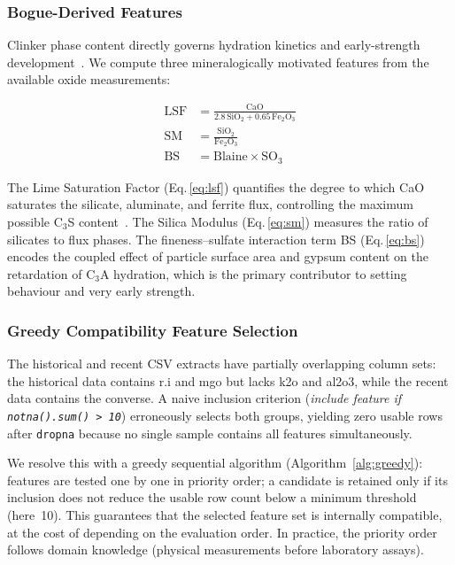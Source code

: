 \documentclass[preprint,12pt]{elsarticle}
\begin{document}
\subsubsection{Bogue-Derived Features}

Clinker phase content directly governs hydration kinetics and early-strength
development~\cite{bogue1929,taylor1997}.
We compute three mineralogically motivated features from the available oxide
measurements:

\begin{align}
  \text{LSF} &= \frac{\text{CaO}}{2.8\,\text{SiO}_2 + 0.65\,\text{Fe}_2\text{O}_3}
  \label{eq:lsf} \\[6pt]
  \text{SM}  &= \frac{\text{SiO}_2}{\text{Fe}_2\text{O}_3}
  \label{eq:sm}  \\[6pt]
  \text{BS}  &= \text{Blaine} \times \text{SO}_3
  \label{eq:bs}
\end{align}

The Lime Saturation Factor (Eq.\,\ref{eq:lsf}) quantifies the degree to which
CaO saturates the silicate, aluminate, and ferrite flux, controlling the maximum
possible C$_3$S content~\cite{taylor1997}.
The Silica Modulus (Eq.\,\ref{eq:sm}) measures the ratio of silicates to flux
phases.
The fineness--sulfate interaction term BS (Eq.\,\ref{eq:bs}) encodes the
coupled effect of particle surface area and gypsum content on the retardation
of C$_3$A hydration, which is the primary contributor to setting behaviour and
very early strength.

\subsubsection{Greedy Compatibility Feature Selection}
\label{sec:greedy}

The historical and recent CSV extracts have partially overlapping column sets:
the historical data contains r.i and mgo but lacks k2o and al2o3, while the
recent data contains the converse.
A naive inclusion criterion (\emph{include feature if \texttt{notna().sum() > 10}})
erroneously selects both groups, yielding zero usable rows after
\texttt{dropna} because no single sample contains all features simultaneously.

We resolve this with a greedy sequential algorithm (Algorithm~\ref{alg:greedy}):
features are tested one by one in priority order; a candidate is retained only
if its inclusion does not reduce the usable row count below a minimum threshold
(here~10).
This guarantees that the selected feature set is internally compatible, at the
cost of depending on the evaluation order.
In practice, the priority order follows domain knowledge
(physical measurements before laboratory assays).
\end{document}
